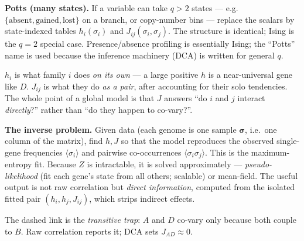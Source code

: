 \documentclass[11pt, oneside]{article}
\newcommand{\sig}{\boldsymbol{\sigma}}
\begin{document}
\textbf{Potts (many states).} If a variable can take $q>2$ states --- e.g.
$\{\text{absent},\text{gained},\text{lost}\}$ on a branch, or copy-number bins --- replace the
scalars by state-indexed tables $h_i(\sigma_i)$ and $J_{ij}(\sigma_i,\sigma_j)$. The structure
is identical; Ising is the $q=2$ special case. Presence/absence profiling is essentially Ising;
the ``Potts'' name is used because the inference machinery (DCA) is written for general $q$.

\begin{intuitionbox}
$h_i$ is what family $i$ does \emph{on its own} --- a large positive $h$ is a near-universal
gene like $D$. $J_{ij}$ is what they do \emph{as a pair}, after accounting for their solo
tendencies. The whole point of a global model is that $J$ answers ``do $i$ and $j$ interact
\emph{directly}?'' rather than ``do they happen to co-vary?''.
\end{intuitionbox}

\textbf{The inverse problem.} Given data (each genome is one sample $\sig$, i.e.\ one column of
the matrix), find $h,J$ so that the model reproduces the observed single-gene frequencies
$\langle\sigma_i\rangle$ and pairwise co-occurrences $\langle\sigma_i\sigma_j\rangle$. This is
the maximum-entropy fit. Because $Z$ is intractable, it is solved approximately ---
\emph{pseudo-likelihood} (fit each gene's state from all others; scalable) or mean-field. The
useful output is not raw correlation but \emph{direct information}, computed from the isolated
fitted pair $(h_i,h_j,J_{ij})$, which strips indirect effects.

\begin{center}
\end{center}
\vspace{-2pt}
The dashed link is the \emph{transitive trap}: $A$ and $D$ co-vary only because both couple to
$B$. Raw correlation reports it; DCA sets $J_{AD}\approx 0$.
\end{document}
